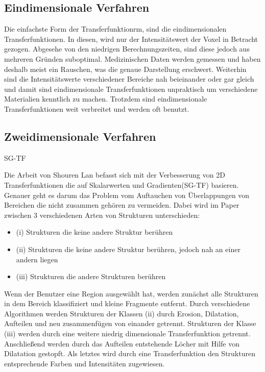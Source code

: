 \subsection{Eindimensionale Verfahren}

Die einfachste Form der Transferfunktionrm, sind die eindimensionalen Transferfunktionen. In diesen, wird nur der Intensitätswert der Voxel in Betracht gezogen. Abgesehe von den niedrigen Berechnungszeiten, sind diese jedoch aus mehreren Gründen suboptimal. Medizinischen Daten werden gemessen und haben deshalb meist ein Rauschen, was die genaue Darstellung erschwert. Weiterhin sind die Intensitätswerte verschiedener Bereiche nah beieinander oder gar gleich und damit sind eindimensionale Transferfunktionen unpraktisch um verschiedene Materialien kenntlich zu machen. Trotzdem sind eindimensionale Transferfunktionen weit verbreitet und werden oft benutzt. 
\newline


\subsection{Zweidimensionale Verfahren}



\cite{kniss2002multidimensional} SG-TF


Die Arbeit von Shouren Lan \cite{lan2017improving} befasst sich mit der Verbesserung von 2D Transferfunktionen die auf Skalarwerten und Gradienten(SG-TF) basieren. Genauer geht es darum das Problem vom Auftauchen von Überlappungen von Bereichen die nicht zusammen gehören zu vermeiden.
\newline
Dabei wird im Paper zwischen 3 verschiedenen Arten von Strukturen unterschieden:
\begin{itemize}
\item (i) Strukturen die keine andere Struktur berühren
\item (ii) Strukturen die keine andere Struktur berühren, jedoch nah an einer andern liegen
\item (iii) Strukturen die andere Strukturen berühren
\end{itemize} 
Wenn der Benutzer eine Region ausgewählt hat, werden zunächst alle Strukturen in dem Bereich klassifiziert und kleine Fragmente entfernt. Durch verschiedene Algorithmen werden Strukturen der Klassen (ii) durch Erosion, Dilatation, Aufteilen und neu zusammenfügen von einander getrennt. Strukturen der Klasse (iii) werden durch eine weitere niedrig dimensionale Transferfunktion getrennt. Anschließend werden durch das Aufteilen entstehende Löcher mit Hilfe von Dilatation gestopft. Als letztes wird durch eine Transferfunktion den Strukturen entsprechende Farben und Intensitäten zugewiesen.






